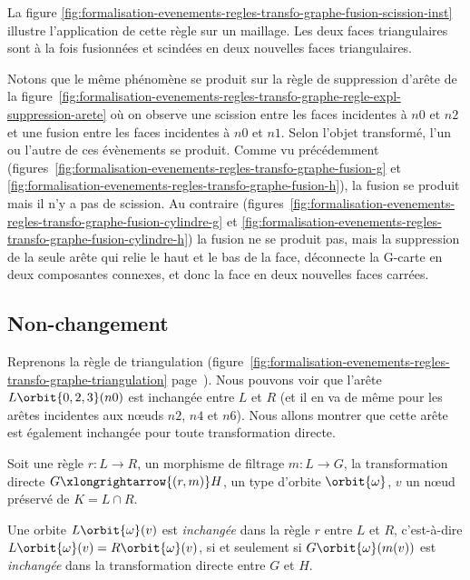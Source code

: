 La figure
\ref{fig:formalisation-evenements-regles-transfo-graphe-fusion-scission-inst}
illustre l'application de cette règle sur un maillage. %
Les deux faces triangulaires sont à la fois fusionnées et scindées en deux
nouvelles faces triangulaires. %

Notons que le même phénomène se produit sur la règle de suppression d'arête de
la
figure~\ref{fig:formalisation-evenements-regles-transfo-graphe-regle-expl-suppression-arete}
où on observe une scission entre les faces incidentes à $n0$ et $n2$ et une
fusion entre les faces incidentes à $n0$ et $n1$. %
Selon l'objet transformé, l'un ou l'autre de ces évènements se produit. %
Comme vu précédemment
(figures~\ref{fig:formalisation-evenements-regles-transfo-graphe-fusion-g} et
\ref{fig:formalisation-evenements-regles-transfo-graphe-fusion-h}), la fusion se
produit mais il n'y a pas de scission. %
Au contraire
(figures~\ref{fig:formalisation-evenements-regles-transfo-graphe-fusion-cylindre-g}
et \ref{fig:formalisation-evenements-regles-transfo-graphe-fusion-cylindre-h})
la fusion ne se produit pas, mais la suppression de la seule arête qui relie le
haut et le bas de la face, déconnecte la G-carte en deux composantes connexes,
et donc la face en deux nouvelles faces carrées. %


\subsection{Non-changement}
\label{sec:formalisation-evenements-regles-transfo-graphe-non-changement}



Reprenons la règle de triangulation
(figure~\ref{fig:formalisation-evenements-regles-transfo-graphe-triangulation}
page~\pageref{fig:formalisation-evenements-regles-transfo-graphe-triangulation}). %
Nous pouvons voir que l'arête $L\orbit{0,2,3}(n0)$ est inchangée entre $L$ et
$R$ (et il en va de même pour les arêtes incidentes aux n\oe uds $n2$, $n4$ et
$n6$). %
Nous allons montrer que cette arête est également inchangée pour toute
transformation directe. %

\begin{proposition}
	\label{prop:base-rule-unchange}
	Soit une règle $r : L \longrightarrow R$, un morphisme de filtrage $m : L \rightarrow G$, la transformation directe $G \xlongrightarrow{(r,m)} H$, un type d'orbite $\orbit{\omega}$,  $v$ un n\oe ud préservé de $K = L \cap R$.

	Une orbite $L\orbit{\omega}(v)$ est \emph{inchangée}
	dans la règle $r$ entre $L$ et $R$, c'est-à-dire $L\orbit{\omega}(v) = R\orbit{\omega}(v)$, si et seulement si $G\orbit{\omega}(m(v))$ est
	\emph{inchangée} dans la transformation directe entre $G$ et $H$.
\end{proposition}

